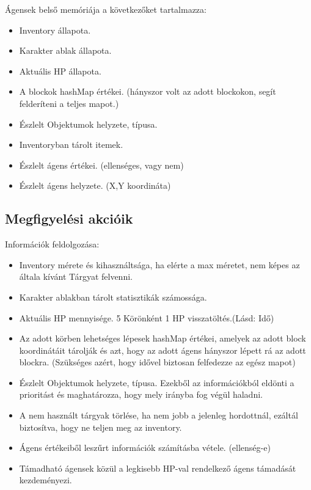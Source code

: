 \noindent Ágensek belső memóriája a következőket tartalmazza:
\begin{itemize}
    \item Inventory állapota.
    \item Karakter ablak állapota.
    \item Aktuális HP állapota.
    \item A blockok hashMap értékei. (hányszor volt az adott blockokon, segít felderíteni a teljes mapot.)
    \item Észlelt Objektumok helyzete, típusa.
    \item Inventoryban tárolt itemek.
    \item Észlelt ágens értékei. (ellenséges, vagy nem)
    \item Észlelt ágens helyzete. (X,Y koordináta)
\end{itemize}

\subsection{Megfigyelési akcióik}

\noindent Információk feldolgozása:
\begin{itemize}
    \item Inventory mérete és kihasználtsága, ha elérte a max méretet, nem képes az általa kívánt Tárgyat felvenni.
    \item Karakter ablakban tárolt statisztikák számossága.
    \item Aktuális HP mennyisége. 5 Körönként 1 HP visszatöltés.(Lásd: Idő)
    \item Az adott körben lehetséges lépesek hashMap értékei, amelyek az adott block koordinátáit tárolják és azt, hogy az adott ágens hányszor lépett rá az adott blockra. (Szükséges azért, hogy idővel biztosan felfedezze az egész mapot)
    \item Észlelt Objektumok helyzete, típusa. Ezekből az információkból eldönti a prioritást és maghatározza, hogy mely irányba fog végül haladni.
    \item A nem használt tárgyak törlése, ha nem jobb a jelenleg hordottnál, ezáltál biztosítva, hogy ne teljen meg az inventory.
    \item Ágens értékeiből leszűrt információk számításba vétele. (ellenség-e)
    \item Támadható ágensek közül a legkisebb HP-val rendelkező ágens támadását kezdeményezi.
\end{itemize}

